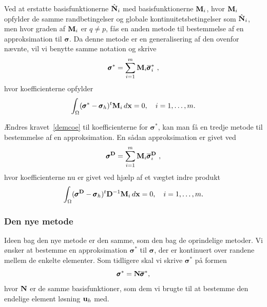 Ved at erstatte basisfunktionerne $\hat{{\bf N}}_i$ med
basisfunktionerne ${\bf M}_i$, hvor ${\bf M}_i$ opfylder de samme
randbetingelser og globale kontinuitetsbetingelser som $\hat{{\bf
N}}_i$, men hvor graden af ${\bf M}_i$ er $q\not = p$, fås en anden
metode til bestemmelse af en approksimation
til $\pmb\sigma$. Da denne metode er en generalisering af den ovenfor
nævnte, vil vi benytte samme notation og skrive
\begin{equation}  \label{proj1}
  \pmb{\sigma}^{\ast} = \sum_{i=1}^m {\bf M}_i 
  \overline{\pmb{\sigma}}^{\ast}_i \ , 
\end{equation}
hvor koefficienterne opfylder
\begin{equation} \label{demcoe}
  \int_{\Omega} (\pmb{\sigma}^{\ast} - \pmb{\sigma}_h)^t
  {\bf M}_i\, d{\bf x}=0, \quad i=1,\ldots,m. 
\end{equation}

Ændres kravet~\eqref{demcoe} til koefficienterne for $\pmb{\sigma}^{\ast}$, kan
man få en tredje metode til bestemmelse af en approksimation. En sådan
approksimation er givet ved
\begin{equation} \label{proj2}
  \pmb{\sigma}^{{\bf D}} = \sum_{i=1}^m {\bf M}_i 
  \overline{\pmb{\sigma}}^{{\bf D}}_i \ , 
\end{equation}
hvor koefficienterne nu er givet ved hjælp af et vægtet indre produkt
\begin{equation} 
  \int_{\Omega} (\pmb{\sigma}^{{\bf D}} - \pmb{\sigma}_h)^t
  {\bf D}^{-1}{\bf M}_i\, d{\bf x}=0, \quad i=1,\ldots,m. 
\end{equation} 

\subsubsection{Den nye metode}
Ideen bag den nye metode er den samme, som den bag de oprindelige
metoder. Vi ønsker at bestemme en approksimation $\pmb{\sigma}^{\ast}$
til $\pmb{\sigma}$, der er kontinuert over randene mellem de enkelte
elementer. Som tidligere skal vi skrive $\pmb{\sigma}^{\ast}$ på formen
\begin{equation} \label{newform}
  \pmb{\sigma}^{\ast} = {\bf N}\overline{\pmb{\sigma}}^{\ast},
\end{equation}
hvor ${\bf N}$ er de samme basisfunktioner, som dem vi brugte til at
bestemme den endelige element løsning ${\bf u}_h$ med.
 

